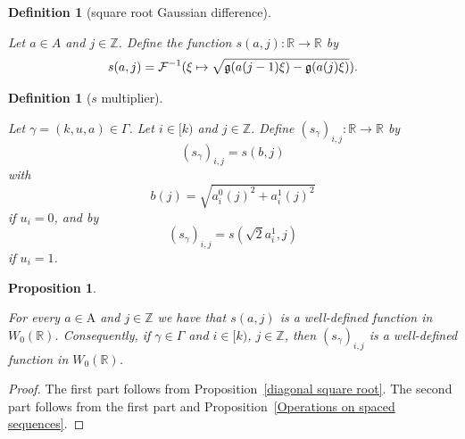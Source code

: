 \documentclass[12pt,reqno]{amsart}
\theoremstyle{plain}
\newtheorem{proposition}[theorem]{Proposition}
\newtheorem{definition}[theorem]{Definition}
\numberwithin{equation}{section}
\theoremstyle{remark}
\newcommand{\uses}[1]{}
\newcommand{\usesdefs}[1]{}
\newcommand{\leanok}{}
\newcommand{\lean}[1]{}
\newcommand{\Z}{{\mathbb Z}}
\newcommand{\R}{{\mathbb R}}
\begin{document}
\begin{definition}[square root Gaussian difference]\label{square root Gaussian difference}\uses{}\usesdefs{gaussian,multiplicatively spaced monotone sequences}
\lean{Auto.squareRootGaussianDifference}
Let $a\in A$ and $j\in\Z$.
Define the function $s(a,j):\R \to \R$ by
\begin{equation}\label{auto:diagonal-Gaussian-square-root}s(a,j) = \mathcal{F}^{-1}(\xi \mapsto \sqrt{\mathfrak{g}(a(j-1)\xi)-\mathfrak{g}(a(j) \xi)}).\end{equation}
\end{definition}

\begin{definition}[$s$ multiplier]\label{s multiplier}\uses{}\usesdefs{geometric parameters,square root Gaussian difference}
\lean{Auto.sMultiplier}
    Let $\gamma=(k,u,a)\in \Gamma$. Let $i\in [k)$ and
    $j\in \Z$. Define  $(s_{\gamma})_{i,j}: \R \to \R$ by
\begin{equation}\label{E:b-definition}
   (s_{\gamma})_{i,j}=s(b,j)
\end{equation}
with
\begin{equation}\label{auto:combined-scale-b}
   b(j)=\sqrt{a_{i}^0(j)^2 + a_{i}^1(j)^2}
\end{equation}
if $u_i=0$, and by
\begin{equation}\label{auto:sandwich-square-root-factor}
   (s_{\gamma})_{i,j}=s(\sqrt{2}a_{i}^1,j)
\end{equation}
if $u_i=1$.
\end{definition}

\begin{proposition}\label{square root Gaussian difference W0}\uses{diagonal square root,Operations on spaced sequences}\usesdefs{auto:Wiener-space-definition,multiplicatively spaced monotone sequences,geometric parameters,square root Gaussian difference,s multiplier}
\lean{Auto.squareRootGaussianDifference_memW0,Auto.sMultiplier_memW0}
\leanok
  For every $a\in\mathrm{A}$ and $j\in\mathbb{Z}$
  we have that $s(a,j)$ is a well-defined function in $W_0(\R)$. Consequently, if $\gamma \in \Gamma$ and $i\in [k)$, $j\in \Z$, then $(s_{\gamma})_{i,j}$ is a well-defined function in $W_0(\R)$.
\end{proposition}

\begin{proof}
The first part follows from Proposition~\ref{diagonal square root}. The second part follows from the first part and Proposition~\ref{Operations on spaced sequences}.
\end{proof}
\end{document}
